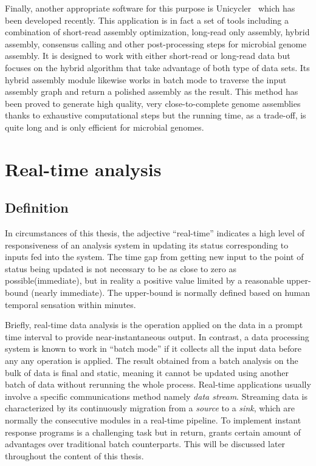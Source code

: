 Finally, another appropriate software for this purpose is Unicycler~\cite{Wick2017unicycler} which has been developed recently. This application is in fact a set of tools including a combination of short-read assembly optimization, long-read only assembly, hybrid assembly, consensus calling and other post-processing steps for microbial genome assembly. It is designed to work with either short-read or long-read data but focuses on the hybrid algorithm that take advantage of both type of data sets. 
Its hybrid assembly module likewise works in batch mode to traverse the input assembly graph and return a polished assembly as the result. %
This method has been proved to generate high quality, very close-to-complete genome assemblies thanks to exhaustive computational steps but the running time, as a trade-off, is quite long and is only efficient for microbial genomes. 
\section{Real-time analysis}
\subsection{Definition}
In circumstances of this thesis, the adjective ``real-time'' indicates  a high level of responsiveness of an analysis system in updating its status corresponding to inputs fed into the system.
The time gap from getting new input to the point of status being updated is not necessary to be as close to zero as possible(immediate), but in reality a positive value limited by a reasonable upper-bound (nearly immediate).
The upper-bound is normally defined based on human temporal sensation \EG{} within minutes.

Briefly, real-time data analysis is the operation applied on the data in a prompt time interval to provide near-instantaneous output.
In contrast, a data processing system is known to work in ``batch mode'' if it collects all the input data before any any operation is applied. The result obtained from a batch analysis on the bulk of data is final and static, meaning it cannot be updated using another batch of data without rerunning the whole process.
Real-time applications usually involve a specific communications method namely \emph{data stream}. Streaming data is characterized by its continuously migration from a \emph{source} to a \emph{sink}, which are normally the consecutive modules in a real-time pipeline.
To implement instant response programs is a challenging task but in return, grants certain amount of advantages over traditional batch counterparts. This will be discussed later throughout the content of this thesis.
